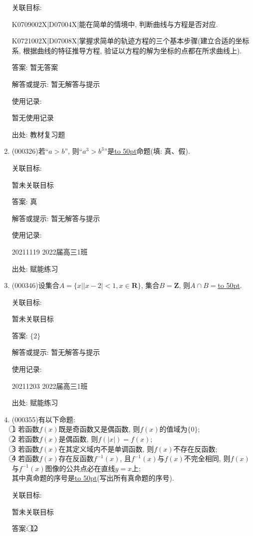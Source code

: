 \documentclass[10pt,a4paper]{article}
\newcommand{\blank}[1]{\underline{\hbox to #1pt{}}}
\begin{document}
\begin{enumerate}[1.]
关联目标:

K0709002X|D07004X|能在简单的情境中, 判断曲线与方程是否对应.

K0721002X|D07008X|掌握求简单的轨迹方程的三个基本步骤(建立合适的坐标系, 根据曲线的特征推导方程, 验证以方程的解为坐标的点都在所求曲线上).

答案: 暂无答案

解答或提示: 暂无解答与提示

使用记录:

暂无使用记录


出处: 教材复习题
\item { (000326)}若``$a>b$'', 则``$a^3>b^3$''是\blank{50}命题(填: 真、假).


关联目标:

暂未关联目标

答案: 真

解答或提示: 暂无解答与提示

使用记录:

20211119	2022届高三1班	


出处: 赋能练习
\item { (000346)}设集合$A=\{x||x-2|<1,x\in \mathbf{R}\}$, 集合$B=\mathbf{Z}$, 则$A\cap B=$\blank{50}.


关联目标:

暂未关联目标

答案: $\{2\}$

解答或提示: 暂无解答与提示

使用记录:

20211203	2022届高三1班	


出处: 赋能练习
\item { (000355)}有以下命题:\\
\textcircled{1} 若函数$f(x)$既是奇函数又是偶函数, 则$f(x)$的值域为$\{0\}$; \\
\textcircled{2} 若函数$f(x)$是偶函数, 则$f(|x|)=f(x)$;\\
\textcircled{3} 若函数$f(x)$在其定义域内不是单调函数, 则$f(x)$不存在反函数;\\
\textcircled{4} 若函数$f(x)$存在反函数${{f}^{-1}}(x)$, 且${{f}^{-1}}(x)$与$f(x)$不完全相同, 则$f(x)$与${{f}^{-1}}(x)$图像的公共点必在直线$y=x$上; \\
其中真命题的序号是\blank{50}(写出所有真命题的序号).


关联目标:

暂未关联目标

答案: \textcircled{1}\textcircled{2}


\end{enumerate}
\end{document}
